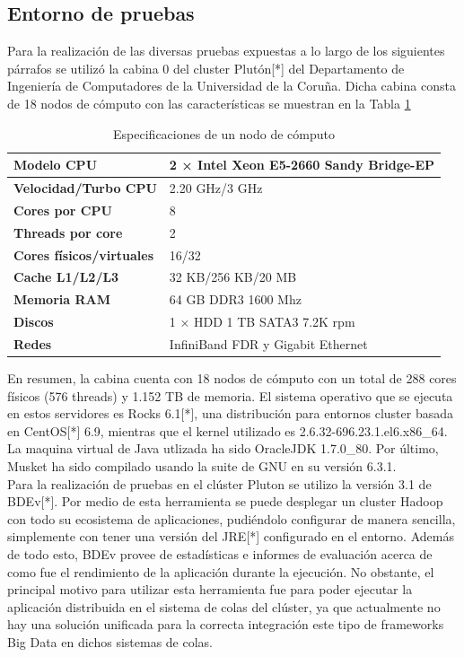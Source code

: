 \documentclass[conference]{IEEEtran}
\begin{document}
\subsection{Entorno de pruebas}
Para la realización de las diversas pruebas expuestas a lo largo de los siguientes párrafos se utilizó la cabina 0 del cluster Plutón[*] del Departamento de Ingeniería de Computadores de la Universidad de la Coruña. Dicha cabina consta de 18 nodos de cómputo con las características se muestran en la Tabla \ref{node_especification}\\ 

\begin{table}[t]
	\begin{center}
		\begin{tabular}{|l|l|}
			\hline
			\textbf{Modelo CPU} & 2 × Intel Xeon E5-2660 Sandy Bridge-EP \\ \hline
			\textbf{Velocidad/Turbo CPU} & 2.20 GHz/3 GHz \\ \hline
			\textbf{Cores por CPU} & 8 \\ \hline
			\textbf{Threads por core} & 2 \\ \hline
			\textbf{Cores físicos/virtuales} & 16/32 \\ \hline
			\textbf{Cache L1/L2/L3} & 32 KB/256 KB/20 MB \\ \hline
			\textbf{Memoria RAM} & 64 GB DDR3 1600 Mhz \\ \hline
			\textbf{Discos} & 1 × HDD 1 TB SATA3 7.2K rpm\\ \hline
			\textbf{Redes} & InfiniBand FDR y Gigabit Ethernet \\ \hline
		\end{tabular}
		\caption{Especificaciones de un nodo de cómputo}
		\label{node_especification}
	\end{center}
\end{table}

En resumen, la cabina cuenta con 18 nodos de cómputo con un total de 288 cores físicos (576 threads) y 1.152 TB de memoria. El sistema operativo que se ejecuta en estos servidores es Rocks 6.1[*], una distribución para entornos cluster basada en CentOS[*] 6.9, mientras que el kernel utilizado es 2.6.32-696.23.1.el6.x86\_64. La maquina virtual de Java utlizada ha sido OracleJDK 1.7.0\_80. Por último, Musket ha sido compilado usando la suite de GNU en su versión 6.3.1.\\

Para la realización de pruebas en el clúster Pluton se utilizo la versión 3.1 de BDEv[*]. Por medio de esta herramienta se puede desplegar un cluster Hadoop con todo su ecosistema de aplicaciones, pudiéndolo configurar de manera sencilla, simplemente con tener una versión del JRE[*] configurado en el entorno. Además de todo esto, BDEv provee de estadísticas e informes de evaluación acerca de como fue el rendimiento de la aplicación durante la ejecución. No obstante, el principal motivo para utilizar esta herramienta fue para poder ejecutar la aplicación distribuida en el sistema de colas del clúster, ya que actualmente no hay una solución unificada para la correcta integración este tipo de frameworks Big Data en dichos sistemas de colas.\\
\end{document}
